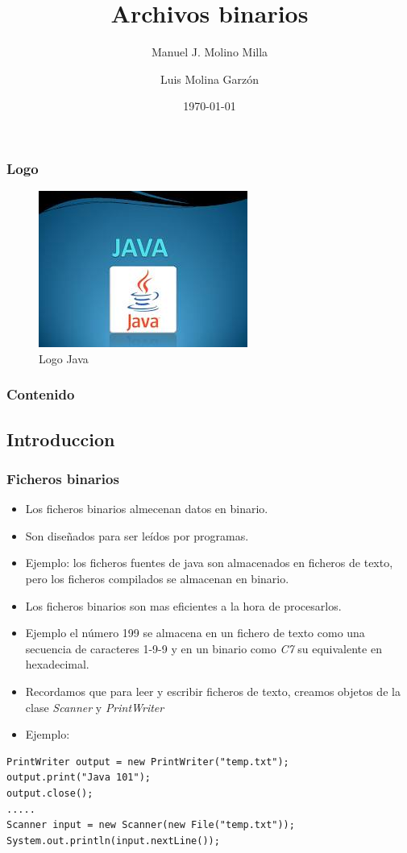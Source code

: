 \documentclass{beamer}
\title{Archivos binarios}
\author{Manuel J. Molino Milla \and Luis Molina Garzón}
\date{\today} %
\institute{IES Virgen del Carmen \and Departamento de Informática}
\begin{document}
\begin{frame}
  \titlepage
\end{frame}

\begin{frame}
    \frametitle{Logo}
\begin{figure}
\includegraphics[scale=1]{imagenes/logo.jpeg} 
\caption{Logo Java}
\end{figure}
\end{frame}

\begin{frame}
  \frametitle{Contenido}
 \tableofcontents[pausesections]
\end{frame}



\subsection{Introduccion}
\begin{frame}[fragile]
\frametitle{Ficheros binarios}
\begin{footnotesize}
\begin{itemize}[<+->]
\item Los ficheros binarios almecenan datos en binario.
\item Son diseñados para ser leídos por programas.
\item Ejemplo: los ficheros fuentes de java son almacenados en ficheros de texto, pero los ficheros compilados se almacenan en binario.
\item Los ficheros binarios son mas eficientes a la hora de procesarlos.
\item Ejemplo el número 199 se almacena en un fichero de texto como una secuencia de caracteres 1-9-9 y en un binario como \emph{C7} su equivalente en hexadecimal.
\item Recordamos que para leer y escribir ficheros de texto, creamos objetos de la clase \emph{Scanner} y \emph{PrintWriter}
\item Ejemplo:
\end{itemize}
\begin{verbatim}
PrintWriter output = new PrintWriter("temp.txt");
output.print("Java 101");
output.close();
.....
Scanner input = new Scanner(new File("temp.txt"));
System.out.println(input.nextLine());
\end{verbatim}
\end{footnotesize}
\end{frame}
\end{document}
